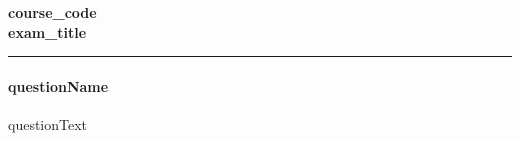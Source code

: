 \documentclass[11pt]{article}
\newif\ifsolutions
\newcommand{\coursecode}{{{course_code}}}
\newcommand{\examtitle}{{{exam_title}}}
\newcommand{\docdate}{{{doc_date}}}
\begin{document}
\ifsolutions
\begin{center}
\Large\bf\coursecode\\[2pt] \examtitle ~Solutions \\ \large\docdate
\end{center}
\paragraph{Important Note:} Do not distribute or share these solutions. Any violations will be referred to the Office of Student Conduct.
\\
\else 
\begin{center}
\Large\bf\coursecode\\[2pt] \examtitle \\
\end{center}
\fi
\hrule

\paragraph{{{questionName}}}
{{questionText}}

\newpage
\end{document}
